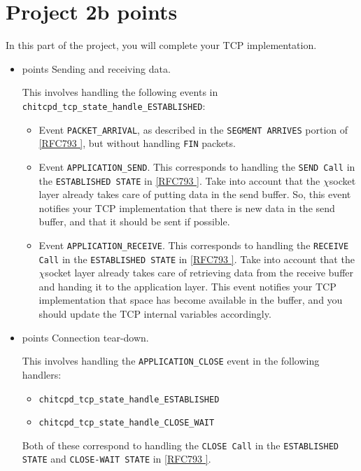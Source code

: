 \documentclass[10pt]{article}
\newcommand{\chisocket}{$\chi$\textsf{socket} }
\newcommand{\RFCsection}[2]{\href{http://tools.ietf.org/html/rfc#1\#section-#2}{[RFC#1 \textsection #2]}}
\newcommand{\points}[1]{{\sffamily\mdseries\guillemotleft #1 points\guillemotright{}}}
\begin{document}
\section{Project 2b \points{100}}
\label{sec:proj2b}

In this part of the project, you will complete your TCP implementation.

\begin{itemize}
 \item \points{75} Sending and receiving data. 
 
 This involves handling the following events in \texttt{chitcpd\_tcp\_state\_handle\_ESTABLISHED}:
 \begin{itemize}
 \item Event \texttt{PACKET\_ARRIVAL}, as described in the \texttt{SEGMENT ARRIVES} portion of \RFCsection{793}{3.9}, but without handling \texttt{FIN} packets.
 \item Event \texttt{APPLICATION\_SEND}. This corresponds to handling the \texttt{SEND Call} in the \texttt{ESTABLISHED STATE} in \RFCsection{793}{3.9}. Take into account that the \chisocket layer already takes care of putting data in the send buffer. So, this event notifies your TCP implementation that there is new data in the send buffer, and that it should be sent if possible.
 \item Event \texttt{APPLICATION\_RECEIVE}. This corresponds to handling the \texttt{RECEIVE Call} in the \texttt{ESTABLISHED STATE} in \RFCsection{793}{3.9}. Take into account that the \chisocket layer already takes care of retrieving data from the receive buffer and handing it to the application layer. This event notifies your TCP implementation that space has become available in the buffer, and you should update the TCP internal variables accordingly. 
 \end{itemize}
 

 \item \points{25} Connection tear-down.
 
 This involves handling the \texttt{APPLICATION\_CLOSE} event in the following handlers:
  \begin{itemize}
  \item \texttt{chitcpd\_tcp\_state\_handle\_ESTABLISHED}
  \item \texttt{chitcpd\_tcp\_state\_handle\_CLOSE\_WAIT}
  \end{itemize}
  
 Both of these correspond to handling the \texttt{CLOSE Call} in the \texttt{ESTABLISHED STATE} and \texttt{CLOSE-WAIT STATE} in \RFCsection{793}{3.9}.
 

\end{itemize}
\end{document}
